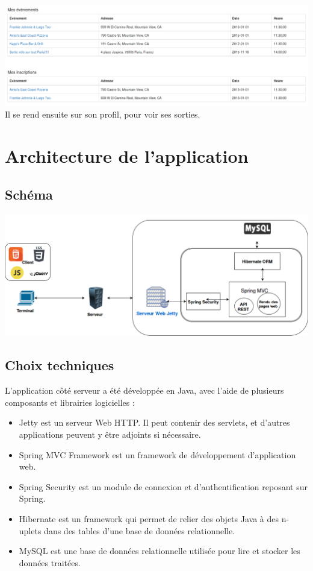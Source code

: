 \documentclass[11pt,a4paper,margin=0.5in]{report}
\begin{document}
\includegraphics[scale=0.33]{illus/prof.png} \\[0.25in]
Il se rend ensuite sur son profil, pour voir ses sorties. \\[0.25in]

\chapter{Architecture de l'application}

\section{Schéma}

\begin{center}
\includegraphics[scale=0.4]{illus/appschema.png} \\[0.25in]
\end{center}

\section{Choix techniques}

L'application côté serveur a été développée en Java, avec l'aide de plusieurs composants et librairies logicielles :

\begin{itemize}
    \item Jetty est un serveur Web HTTP. Il peut contenir des servlets, et d'autres applications peuvent y être adjoints si nécessaire. 
    \item Spring MVC Framework est un framework de développement d'application web.
    \item Spring Security est un module de connexion et d'authentification reposant sur Spring. 
    \item Hibernate est un framework qui permet de relier des objets Java à des n-uplets dans des tables d'une base de données relationnelle.
    \item MySQL est une base de données relationnelle utilisée pour lire et stocker les données traitées.
\end{itemize}
\end{document}
